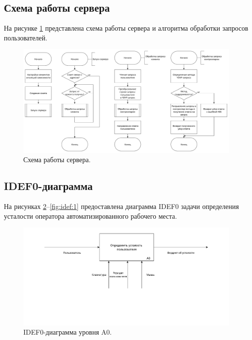 \subsection{Схема работы сервера}

На рисунке \ref{fig:serverWork} представлена схема работы сервера и алгоритма обработки запросов пользователей.

\begin{figure}[H]
	\centering
	\includegraphics[width=\textwidth]{img/serverWorkScheme.pdf}
	\caption{Схема работы сервера.}
	\label{fig:serverWork}
\end{figure}

\subsection{IDEF0-диаграмма}
На рисунках \ref{fig:idef:0}--\ref{fig:idef:1} предоставлена диаграмма IDEF0 задачи определения усталости оператора автоматизированного рабочего места.

\begin{figure}[H]
	\centering
	\includegraphics[width=\textwidth]{img/A0.pdf}
	\caption{IDEF0-диаграмма уровня A0.}
	\label{fig:idef:0}
\end{figure}

